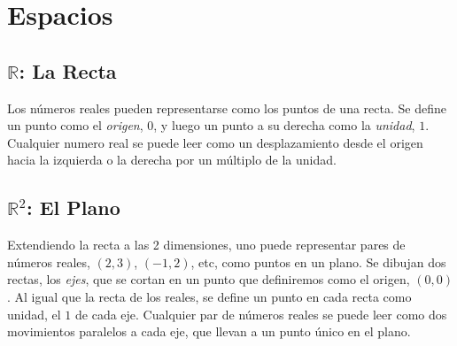 \documentclass[../teoria.root.tex]{subfiles}
\begin{document}
\section{Espacios}

\subsection{$\mathbb{R}$: La Recta}

Los números reales pueden representarse como los puntos de una recta. Se define
un punto como el \textit{origen}, $0$, y luego un punto a su derecha como la
\textit{unidad}, $1$. Cualquier numero real se puede leer como un
desplazamiento desde el origen hacia la izquierda o la derecha por un múltiplo
de la unidad.

\begin{center}
\end{center}


\subsection{$\mathbb{R}^2$: El Plano}

Extendiendo la recta a las 2 dimensiones, uno puede representar pares de
números reales, $(2,3)$, $(-1,2)$, etc, como puntos en un plano. Se dibujan dos
rectas, los \textit{ejes}, que se cortan en un punto que definiremos como el
origen, $(0,0)$. Al igual que la recta de los reales, se define un punto en
cada recta como unidad, el $1$ de cada eje. Cualquier par de números reales se
puede leer como dos movimientos paralelos a cada eje, que llevan a un punto
único en el plano.
\end{document}
